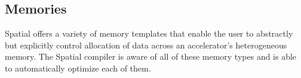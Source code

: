 





\subsection{Memories}
Spatial offers a variety of memory templates that enable the user to abstractly but explicitly control allocation of data across an accelerator's heterogeneous memory.
The Spatial compiler is aware of all of these memory types and is able to automatically optimize each of them.

